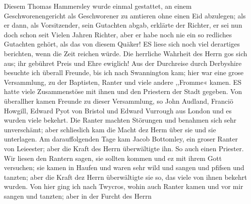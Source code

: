 Diesem Thomas Hammersley wurde einmal gestattet, an
einem Geschworenengericht als Geschworener zu amtieren ohne
einen Eid abzulegen; als er dann, als 
Vorsitzender, sein Gutachten abgab, erklärte der Richter, 
er sei nun doch schon seit Vielen
Jahren Richter, aber er habe noch nie ein so redliches Gutachten
gehört, als das von diesem Quäker! ES liese sich noch viel
derartiges berichten, wenn die Zeit reichen würde. Die herrliche
Wahrheit des Herrn gos sich aus; ihr gebühret Preis und Ehre
ewiglich!
Aus der Durchreise durch Derbyshire besuchte ich überall
Freunde, bis ich nach Swannington kam; hier war eine grose
Versammlung, zu der Baptisten, Ranter und viele andere ,,Fromme«
kamen. ES hatte viele Zusammenstöse mit ihnen und den Priestern
der Stadt gegeben. Von überallher kamen Freunde zu dieser
Versammlung, so John Audland, Franciö Howgill, Edward Pyot
von Bristol und Edward Vurrough aus London und es wurden
viele bekehrt. Die Ranter machten Störungen und benahmen sich
sehr unverschämt; aber schlieslich kam die Macht dez Herm über
sie und sie unterlagen. Am darauffolgenden Tage kam Jacob
Bottomley, ein groser Ranter von Leieester; aber die Kraft des
Herrn überwältigte ihn. So auch einen Priester. Wir liesen
den Rantern sagen, sie sollten kommen und ez mit ihrem Gott
versuchen; sie kamen in Haufen und waren sehr wild und sangen
und pfifsen und tanzten; aber die Kraft dez Herrn überwältigte
sie so, das viele von ihnen bekehrt wurden.
Von hier ging ich nach Twycros, wohin auch Ranter kamen
und vor mir sangen und tanzten; aber in der Furcht des Herrn


